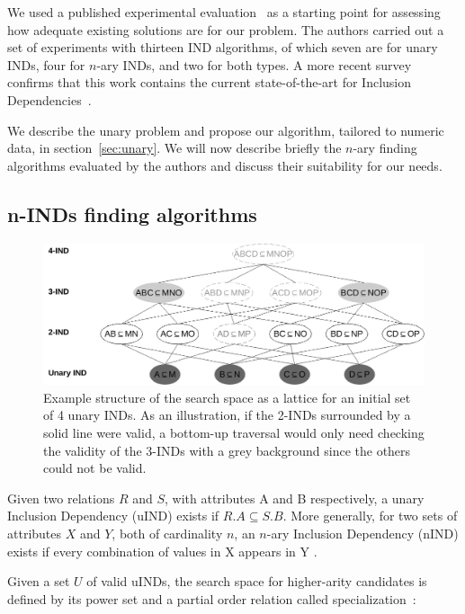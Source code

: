 We used a published experimental evaluation~\cite{Dursch2019} as a starting point for
assessing how adequate existing solutions are for our problem. The authors carried out a
set of experiments with thirteen IND algorithms, of which seven are for unary INDs,
four for $n$-ary INDs, and two for both types. A more recent survey confirms that this
work contains the current state-of-the-art for Inclusion
Dependencies~\cite{kossmann_data_2022}.

We describe the unary problem and propose our algorithm, tailored to
numeric data, in section~\ref{sec:unary}. We will now describe briefly the $n$-ary finding
algorithms evaluated by the authors and discuss their suitability for our needs.

\subsection{n-INDs finding algorithms}
\label{sec:nind_finding}
\begin{figure}[ht]
    \centering
    \includegraphics[width=\linewidth]{images/presq/lattice}
    \caption{
        Example structure of the search space as a lattice for an initial set
        of 4 unary INDs.
        As an illustration, if the 2-INDs surrounded by a solid line were valid,
        a bottom-up traversal would only need checking the validity of the 3-INDs with a 
        grey background since the others could not be valid.
    }
    \label{fig:lattice}
\end{figure}

Given two relations $R$ and $S$, with attributes A and B respectively,
a unary Inclusion Dependency (uIND) exists if $R.A \subseteq S.B$.
More generally, for two sets of attributes $X$ and $Y$, both of cardinality $n$, an
$n$-ary Inclusion Dependency (nIND) exists if every combination of values in X appears in Y
\cite{DeMarchi2002,abedjan2015}.

Given a set $U$ of valid uINDs, the search space for
higher-arity candidates is defined by its power set and a partial order relation
called specialization~\cite{DeMarchi2002}:

